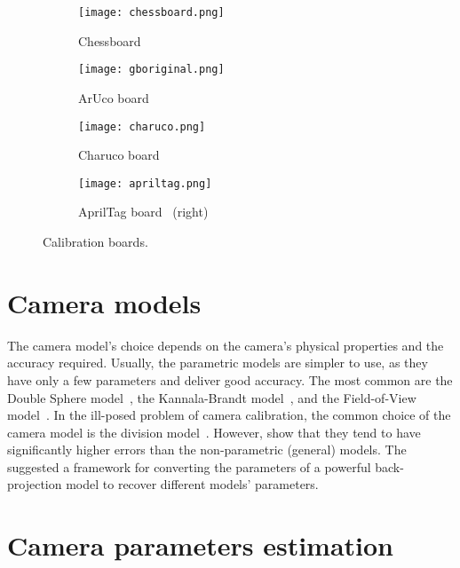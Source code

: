 \begin{figure}[h]
\centering
\begin{subfigure}[b]{0.45\textwidth}
\centering
\texttt{[image: chessboard.png]}
\caption{Chessboard~\cite{OpenCVCameraCalibration}}
\label{fig:chessboard}
\end{subfigure}
\hfill
\begin{subfigure}[b]{0.45\textwidth}
\centering
\texttt{[image: gboriginal.png]}
\caption{ArUco board~\cite{OpenCVDetectionArUco}}
\label{fig:gboriginal}
\end{subfigure}
\begin{subfigure}[b]{0.45\textwidth}
\centering
\texttt{[image: charuco.png]}
\caption{Charuco board~\cite{OpenCVDetectionChArUco}}
\label{fig:charuco}
\end{subfigure}
\hfill
\begin{subfigure}[b]{0.45\textwidth}
\centering
\texttt{[image: apriltag.png]}
  \caption{AprilTag board~\cite{rosebrockAprilTagPython2020} (right)}
\label{fig:apriltag}
\end{subfigure}
\caption{Calibration boards.}
\end{figure}

\section{Camera models}\label{sub:camera_models}

The camera model's choice depends on the camera's physical properties
and the accuracy required. Usually, the parametric models are simpler to use, as
they have only a few parameters and deliver good accuracy. 
The most common are the Double Sphere
model~\cite{usenkoDoubleSphereCamera2018}, the Kannala-Brandt
model~\cite{kannalaGenericCameraModel2006}, and the Field-of-View
model~\cite{devernayStraightLinesHave2001}.
In the ill-posed problem of camera calibration, the common choice
of the camera model is the division
model~\cite{fitzgibbonSimultaneousLinearEstimation2001}.
However, \textcite{schopsWhyHaving102020} show that they tend to have
significantly higher errors than the non-parametric (general) models.
The \textcite{lochmanBabelCalibUniversalApproach2021} suggested a framework for
converting the parameters of a powerful back-projection
\cite{zhangFlexibleNewTechnique2000} model to recover different models' parameters.

\section{Camera parameters estimation}\label{sub:camera_parameters_estimation}

